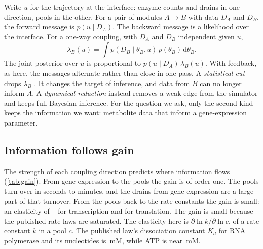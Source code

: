 Write $u$ for the trajectory at the interface: enzyme counts and drains in one
direction, pools in the other. For a pair of modules $A \to B$ with data $D_A$ and
$D_B$, the forward message is $p(u \mid D_A)$. The backward message is a likelihood
over the interface. For a one-way coupling, with $D_A$ and $D_B$ independent given $u$, \begin{equation}
  \lambda_B(u) = \int p(D_B \mid \theta_B, u)\, p(\theta_B)\, \mathrm{d}\theta_B .
\end{equation}
The joint posterior over $u$ is proportional to $p(u \mid D_A)\,\lambda_B(u)$. With feedback, as here, the messages alternate rather than close in one pass. A
\emph{statistical cut} drops $\lambda_B$ \cite{plummer2015cuts}. It changes the
target of inference, and data from $B$ can no longer inform $A$. A \emph{dynamical
reduction} instead removes a weak edge from the simulator and keeps full Bayesian
inference. For the question we ask, only the second kind keeps the information we
want: metabolite data that inform a gene-expression parameter.

\subsection{Information follows gain}

The strength of each coupling direction predicts where information flows
(\cref{tab:gain}). From gene expression to the pools the gain is of order one. The
pools turn over in seconds to minutes, and the drains from gene expression are a
large part of that turnover. From the pools back to the rate constants the gain is
small: an elasticity of -- for transcription and
 for translation. The gain is small because the published rate laws are
saturated. The elasticity here is $\partial \ln k / \partial \ln c$, of a rate constant $k$ in a pool $c$. The published law's dissociation constant $K_d$ for RNA polymerase and its nucleotides is \,mM, while ATP is near \,mM.

